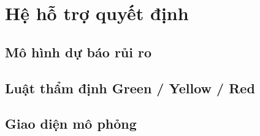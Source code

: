 \chapter{Hệ hỗ trợ quyết định}
\section{Mô hình dự báo rủi ro}
\section{Luật thẩm định Green / Yellow / Red}
\section{Giao diện mô phỏng}
